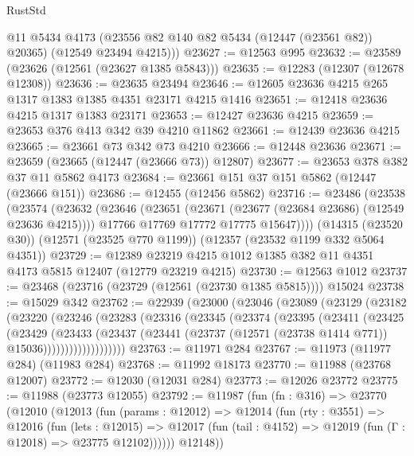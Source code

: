 \begin{lexlean}{RustStd}
\begin{coremodule}
        @11
        @5434
        @4173
        (@23556 @82 @140 @82 @5434 (@12447 (@23561 @82)) @20365)
        (@12549 @23494 @4215)))
@23627 := @12563 @995
@23632 := @23589 (@23626 (@12561 (@23627 @1385 @5843)))
@23635 := @12283 (@12307 (@12678 @12308))
@23636 := @23635 @23494
@23646 := @12605 @23636 @4215 @265 @1317 @1383 @1385 @4351 @23171 @4215 @1416
@23651 := @12418 @23636 @4215 @1317 @1383 @23171
@23653 := @12427 @23636 @4215
@23659 := @23653 @376 @413 @342 @39 @4210 @11862
@23661 := @12439 @23636 @4215
@23665 := @23661 @73 @342 @73 @4210
@23666 := @12448 @23636
@23671 := @23659 (@23665 (@12447 (@23666 @73)) @12807)
@23677 := @23653 @378 @382 @37 @11 @5862 @4173
@23684 := @23661 @151 @37 @151 @5862 (@12447 (@23666 @151))
@23686 := @12455 (@12456 @5862)
@23716 := @23486
    (@23538
      (@23574
        (@23632
          (@23646
            (@23651 (@23671 (@23677 (@23684 @23686) (@12549 @23636 @4215))))
            @17766
            @17769
            @17772
            @17775
            @15647))))
    (@14315 (@23520 @30))
    (@12571 (@23525 @770 @1199))
    (@12357 (@23532 @1199 @332 @5064 @4351))
@23729 := @12389 @23219 @4215 @1012 @1385 @382 @11 @4351 @4173 @5815 @12407 (@12779 @23219 @4215)
@23730 := @12563 @1012
@23737 := @23468 (@23716 (@23729 (@12561 (@23730 @1385 @5815)))) @15024
@23738 := @15029 @342
@23762 := @22939
    (@23000
      (@23046
        (@23089
          (@23129
            (@23182
              (@23220
                (@23246
                  (@23283
                    (@23316
                      (@23345
                        (@23374
                          (@23395
                            (@23411
                              (@23425
                                (@23429
                                  (@23433
                                    (@23437
                                      (@23441
                                        (@23737
                                          (@12571 (@23738 @1414 @771))
                                          @15036)))))))))))))))))))
@23763 := @11971 @284
@23767 := @11973 (@11977 @284) (@11983 @284)
@23768 := @11992 @18173
@23770 := @11988 (@23768 @12007)
@23772 := @12030 (@12031 @284)
@23773 := @12026 @23772
@23775 := @11988 (@23773 @12055)
@23792 := @11987
    (fun (fn : @316) =>
    @23770
      (@12010
        (@12013
          (fun (params : @12012) =>
          @12014
            (fun (rty : @3551) =>
            @12016
              (fun (lets : @12015) =>
              @12017 (fun (tail : @4152) => @12019 (fun (Γ : @12018) => @23775 @12102))))))
        @12148))

\end{coremodule}
\end{lexlean}
